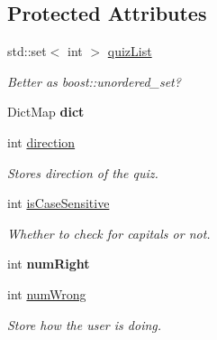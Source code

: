 \subsection*{Protected Attributes}
\begin{DoxyCompactItemize}
\item 
std::set$<$ int $>$ \hyperlink{classVocabQuiz_a294e44914f7766a1cdfff9ae87c722ff}{quizList}
\begin{DoxyCompactList}\small\item\em Better as boost::unordered\_\-set? \item\end{DoxyCompactList}\item 
\hypertarget{classVocabQuiz_af9090d47e0a1e8b3b40c39f55afd60a1}{
DictMap {\bfseries dict}}
\label{classVocabQuiz_af9090d47e0a1e8b3b40c39f55afd60a1}

\item 
\hypertarget{classVocabQuiz_aae316737b7faea73886cff3f88836585}{
int \hyperlink{classVocabQuiz_aae316737b7faea73886cff3f88836585}{direction}}
\label{classVocabQuiz_aae316737b7faea73886cff3f88836585}

\begin{DoxyCompactList}\small\item\em Stores direction of the quiz. \item\end{DoxyCompactList}\item 
\hypertarget{classVocabQuiz_a882a7e2c7666126e836b0bc48765d476}{
int \hyperlink{classVocabQuiz_a882a7e2c7666126e836b0bc48765d476}{isCaseSensitive}}
\label{classVocabQuiz_a882a7e2c7666126e836b0bc48765d476}

\begin{DoxyCompactList}\small\item\em Whether to check for capitals or not. \item\end{DoxyCompactList}\item 
\hypertarget{classVocabQuiz_aa54ad066a9ed72dd85745e04a4c6e4a3}{
int {\bfseries numRight}}
\label{classVocabQuiz_aa54ad066a9ed72dd85745e04a4c6e4a3}

\item 
\hypertarget{classVocabQuiz_ac8fb7099c94406f341011218d8cd04d0}{
int \hyperlink{classVocabQuiz_ac8fb7099c94406f341011218d8cd04d0}{numWrong}}
\label{classVocabQuiz_ac8fb7099c94406f341011218d8cd04d0}

\begin{DoxyCompactList}\small\item\em Store how the user is doing. \item\end{DoxyCompactList}\end{DoxyCompactItemize}



